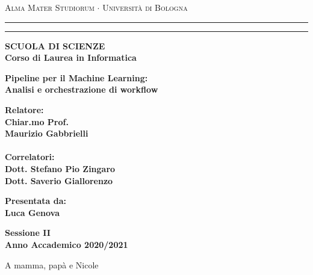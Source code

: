 \documentclass[12pt,a4paper]{report}
\newenvironment{dedication}
{%
\thispagestyle{empty}%
\vspace*{\stretch{1}}%
\itshape             %
\raggedleft          %
}
{\par %
\vspace{\stretch{3}} %
\clearpage           %
}
\begin{document}
\begin{titlepage}
\begin{center}
{{\Large{\textsc{Alma Mater Studiorum $\cdot$ Universit\`a di
Bologna}}}} \rule[0.1cm]{15.8cm}{0.1mm}
\rule[0.5cm]{15.8cm}{0.6mm}
{\small{\bf SCUOLA DI SCIENZE\\
Corso di Laurea in Informatica }}
\end{center}
\vspace{15mm}


\begin{center}
{\LARGE{\bf Pipeline per il Machine Learning:}}\\
\vspace{3mm}
{\LARGE{\bf Analisi e orchestrazione di workflow}}\\
\end{center}
\vspace{40mm}
\par
\noindent
\begin{minipage}[t]{0.47\textwidth}
{\large{\bf Relatore:\\
Chiar.mo Prof.\\
Maurizio Gabbrielli\\
\\
Correlatori:\\
Dott. Stefano Pio Zingaro\\
Dott. Saverio Giallorenzo\\
}}
\end{minipage}
\hfill
\begin{minipage}[t]{0.47\textwidth}\raggedleft
{\large{\bf Presentata da:\\
Luca Genova}}
\end{minipage}
\vspace{20mm}
\begin{center}
{\large{\bf Sessione II\\%
Anno Accademico 2020/2021}}%
\end{center}
\end{titlepage}

\begin{dedication}
    A mamma, papà e Nicole
\end{dedication}

\tableofcontents
\end{document}

